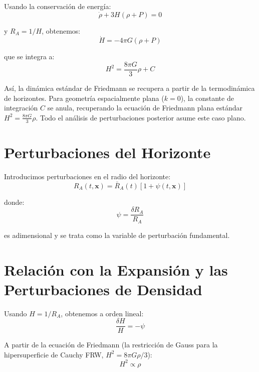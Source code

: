 \documentclass[12pt,a4paper]{article}
\begin{document}
Usando la conservación de energía:
\begin{equation}
\dot{\rho} + 3H(\rho + P) = 0 \tag{9}
\end{equation}

y $R_A = 1/H$, obtenemos:
\begin{equation}
\dot{H} = -4\pi G(\rho + P) \tag{10}
\end{equation}

que se integra a:
\begin{equation}
H^2 = \frac{8\pi G}{3}\rho + C \tag{11}
\end{equation}

Así, la dinámica estándar de Friedmann se recupera a partir de la termodinámica de horizontes. Para geometría espacialmente plana ($k = 0$), la constante de integración $C$ se anula, recuperando la ecuación de Friedmann plana estándar $H^2 = \frac{8\pi G}{3}\rho$. Todo el análisis de perturbaciones posterior asume este caso plano.

\section{Perturbaciones del Horizonte}

Introducimos perturbaciones en el radio del horizonte:
\begin{equation}
R_A(t, \mathbf{x}) = \bar{R}_A(t)\left[1 + \psi(t, \mathbf{x})\right] \tag{12}
\end{equation}

donde:
\begin{equation}
\psi = \frac{\delta R_A}{R_A} \tag{13}
\end{equation}

es adimensional y se trata como la variable de perturbación fundamental.

\section{Relación con la Expansión y las Perturbaciones de Densidad}

Usando $H = 1/R_A$, obtenemos a orden lineal:
\begin{equation}
\frac{\delta H}{H} = -\psi \tag{14}
\end{equation}

A partir de la ecuación de Friedmann (la restricción de Gauss para la hipersuperficie de Cauchy FRW, $H^2 = 8\pi G\rho/3$):
\begin{equation}
H^2 \propto \rho \tag{15}
\end{equation}
\end{document}
